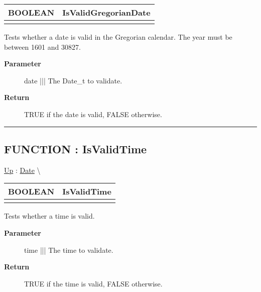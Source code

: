{\renewcommand{\arraystretch}{1.5}
\begin{tabularx}{\textwidth}{|>{\raggedright\arraybackslash}l|X|}
\hline
\hspace{0pt}BOOLEAN & IsValidGregorianDate \\
\hline
\multicolumn{2}{|>{\raggedright\arraybackslash}X|}{\hspace{0pt}(Date\_t date)} \\
\hline
\end{tabularx}
}

\par
Tests whether a date is valid in the Gregorian calendar. The year must be between 1601 and 30827.

\par
\begin{description}
\item [\textbf{Parameter}] date ||| The Date\_t to validate.
\item [\textbf{Return}] TRUE if the date is valid, FALSE otherwise.
\end{description}

\rule{\linewidth}{0.5pt}
\subsection*{FUNCTION : IsValidTime}
\hypertarget{ecldoc:date.isvalidtime}{}
\hyperlink{ecldoc:Date}{Up} :
\hspace{0pt} \hyperlink{ecldoc:Date}{Date} \textbackslash 

{\renewcommand{\arraystretch}{1.5}
\begin{tabularx}{\textwidth}{|>{\raggedright\arraybackslash}l|X|}
\hline
\hspace{0pt}BOOLEAN & IsValidTime \\
\hline
\multicolumn{2}{|>{\raggedright\arraybackslash}X|}{\hspace{0pt}(Time\_t time)} \\
\hline
\end{tabularx}
}

\par
Tests whether a time is valid.

\par
\begin{description}
\item [\textbf{Parameter}] time ||| The time to validate.
\item [\textbf{Return}] TRUE if the time is valid, FALSE otherwise.
\end{description}

